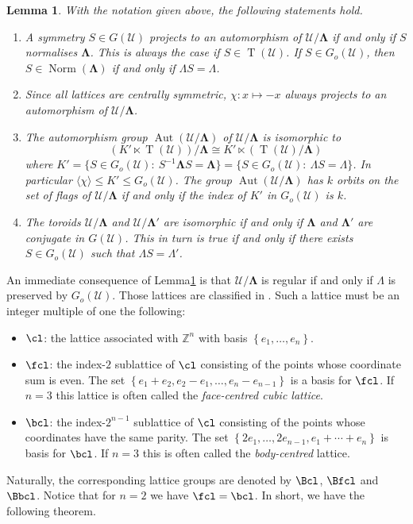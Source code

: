 \documentclass[final]{amsart}
\theoremstyle{plain}
\newtheorem{lemma}[thm]{Lemma}
\theoremstyle{definition}
\theoremstyle{remark}
\numberwithin{equation}{section}
\renewcommand{\leq}{\leqslant} \renewcommand{\geq}{\geqslant}
\renewcommand{\{}{\lbrace}
\renewcommand{\}}{\rbrace}
\newcommand{\bZ}{\mathbb{Z}}
\newcommand{\cU}{\mathcal{U}}
\newcommand{\LL}{\Lambda}
\newcommand{\bLL}{\mathbf{\Lambda}}
\DeclareMathOperator{\norm}{Norm}
\DeclareMathOperator{\aut}{Aut} \DeclareMathOperator{\autp}{\aut^{+}}
\DeclareMathOperator{\tras}{T}
\newcommand{\UoverL}{\cU/\bLL}
\newcommand{\minid}{\chi}
\begin{document}
\begin{lemma}\label{lem:toroids}
	With the notation given above, the following statements hold.
	\begin{enumerate}
		\item A symmetry $S \in G(\cU)$ projects to an automorphism of $\UoverL$ if and only if $S$ normalises $\bLL$. 
    This is always the case if $S \in \tras(\cU)$. If $S\in G_{o}(\cU)$, then $S \in \norm(\bLL)$  if and only if $\LL S = \LL$.
		\item Since all lattices are centrally symmetric, $\minid:x \mapsto -x$ always projects to an automorphism of $\UoverL$.
		\item The automorphism group $\aut (\UoverL)$ of $\UoverL$ is isomorphic to \[(K' \ltimes \tras(\cU)	) / \bLL \cong K' \ltimes (\tras(\cU) / \bLL )\] where $K'=\{S \in G_{o}(\cU) : \ S^{-1} \bLL S = \bLL \} =\{S \in G_{o}(\cU) \colon\  \LL S = \LL \}$. 
    In particular $\langle \minid \rangle \leq K' \leq G_{o}(\cU)$. The group $\aut(\UoverL)$ has $k$ orbits on the set of flags of $\UoverL$ if and only if the index of $K'$ in $G_{o}(\cU)$ is $k$.
		\item The toroids $\UoverL$ and $\UoverL'$ are isomorphic if and only if $\bLL$ and $\bLL'$ are conjugate in $G(\cU)$. 
    This in turn is true if and only if  there exists $S \in G_{o}(\cU)$ such that $\LL S = \LL'$.
	\end{enumerate}
\end{lemma}

An immediate consequence of Lemma\nobreakspace \ref {lem:toroids} is that $\UoverL$ is regular if and only if $\LL$ is preserved by $G_{o}(\cU)$.
Those lattices are classified in \cite[Section 6D]{McMullenSchulte_2002_AbstractRegularPolytopes}. Such a lattice must be an integer multiple of one the following:
\begin{itemize}
  \item $\cl$: the lattice associated with $\bZ^{n}$ with basis $\left\{ e_{1}, \dots, e_{n} \right\}$.
  \item $\fcl$: the index-$2$ sublattice of $\cl$ consisting of the points whose coordinate sum is even. The set $\left\{  e_{1} + e_{2}, e_{2}- e_{1}, \dots, e_{n}-e_{n-1}\right\}$ is a basis for $\fcl$. If $n=3$ this lattice is often called the \emph{face-centred cubic lattice}.
  \item $\bcl$:  the index-$2^{n-1}$ sublattice of $\cl$ consisting of the points whose coordinates have the same parity. The set $\left\{ 2e_{1}, \dots, 2e_{n-1}, e_{1}+\cdots+e_{n} \right\}$ is basis for $\bcl$. If $n=3$ this is often called the \emph{body-centred} lattice.
\end{itemize}
Naturally, the corresponding lattice groups are denoted by $\Bcl$, $\Bfcl$ and $\Bbcl$. 
Notice that for $n=2$ we have $\fcl = \bcl$. 
In short, we have the following theorem.
\end{document}
